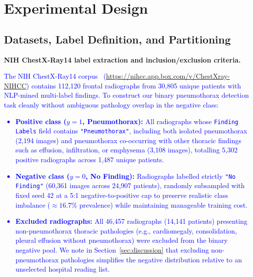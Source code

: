 \documentclass[diagnostics,article,submit,moreauthors]{Definitions/mdpi}
\newcommand{\rev}[1]{\textcolor{blue}{#1}}
\begin{document}
\section{Experimental Design}
\label{sec:experimental}

\subsection{Datasets, Label Definition, and Partitioning}

\textbf{NIH ChestX-Ray14 label extraction and inclusion/exclusion criteria.} \rev{The NIH ChestX-Ray14 corpus~\cite{wang2017chestxray} (\url{https://nihcc.app.box.com/v/ChestXray-NIHCC}) contains 112,120 frontal radiographs from 30,805 unique patients with NLP-mined multi-label findings. To construct our binary pneumothorax detection task cleanly without ambiguous pathology overlap in the negative class:
\begin{itemize}
\item \textbf{Positive class ($y=1$, Pneumothorax):} All radiographs whose \texttt{Finding Labels} field contains \texttt{"Pneumothorax"}, including both isolated pneumothorax (2,194 images) and pneumothorax co-occurring with other thoracic findings such as effusion, infiltration, or emphysema (3,108 images), totalling 5,302 positive radiographs across 1,487 unique patients.
\item \textbf{Negative class ($y=0$, No Finding):} Radiographs labelled strictly \texttt{"No Finding"} (60,361 images across 24,907 patients), randomly subsampled with fixed seed 42 at a 5:1 negative-to-positive cap to preserve realistic class imbalance ($\approx 16.7\%$ prevalence) while maintaining manageable training cost.
\item \textbf{Excluded radiographs:} All 46,457 radiographs (14,141 patients) presenting non-pneumothorax thoracic pathologies (e.g., cardiomegaly, consolidation, pleural effusion without pneumothorax) were excluded from the binary negative pool. We note in Section~\ref{sec:discussion} that excluding non-pneumothorax pathologies simplifies the negative distribution relative to an unselected hospital reading list.
\end{itemize}}
\end{document}
